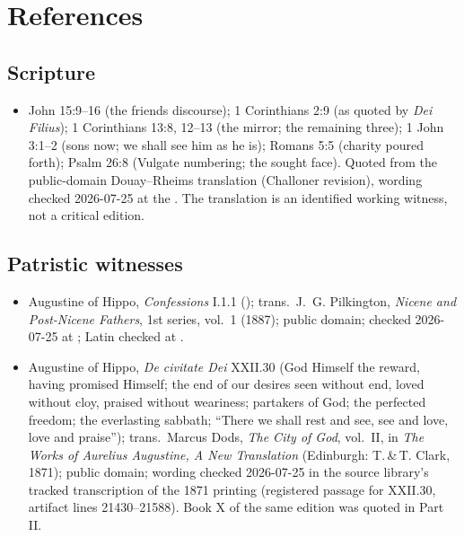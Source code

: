\section{References}

\begingroup
\setlength{\parskip}{0pt}
\titlespacing*{\subsection}{0pt}{1.0ex}{0.3ex}

\subsection*{Scripture}

{\fontsize{8.6}{9.6}\selectfont
\begin{itemize}[itemsep=0pt,parsep=0pt,topsep=0.05em]
\item John 15:9--16 (the friends discourse); 1 Corinthians 2:9 (as quoted by \emph{Dei Filius}); 1 Corinthians 13:8, 12--13 (the mirror; the remaining three); 1 John 3:1--2 (sons now; we shall see him as he is); Romans 5:5 (charity poured forth); Psalm 26:8 (Vulgate numbering; the sought face). Quoted from the public-domain Douay--Rheims translation (Challoner revision), wording checked 2026-07-25 at the . The translation is an identified working witness, not a critical edition.
\end{itemize}}

\subsection*{Patristic witnesses}

{\fontsize{8.6}{9.6}\selectfont
\begin{itemize}[itemsep=0pt,parsep=0pt,topsep=0.05em]
\item Augustine of Hippo, \emph{Confessions} I.1.1 (); trans.\ J.~G. Pilkington, \emph{Nicene and Post-Nicene Fathers}, 1st series, vol.~1 (1887); public domain; checked 2026-07-25 at ; Latin checked at .
\item Augustine of Hippo, \emph{De civitate Dei} XXII.30 (God Himself the reward, having promised Himself; the end of our desires seen without end, loved without cloy, praised without weariness; partakers of God; the perfected freedom; the everlasting sabbath; ``There we shall rest and see, see and love, love and praise''); trans.\ Marcus Dods, \emph{The City of God}, vol.~II, in \emph{The Works of Aurelius Augustine, A New Translation} (Edinburgh: T.\,\&\,T. Clark, 1871); public domain; wording checked 2026-07-25 in the source library's tracked transcription of the 1871 printing (registered passage for XXII.30, artifact lines 21430--21588). Book X of the same edition was quoted in Part II.
\end{itemize}}

